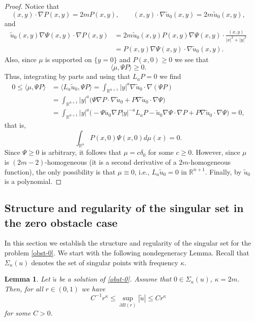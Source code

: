 \documentclass[11pt]{amsart}
\theoremstyle{plain}
\newtheorem{lemma}[thrm]{Lemma}
\numberwithin{equation}{section}
\begin{document}
\begin{proof}
Notice that
\[(x,y)\cdot \nabla P(x,y)=2mP(x,y),\qquad (x,y)\cdot \nabla \tilde u_0(x,y)=2m\tilde u_0(x,y),\]
and
\[\begin{split}
\tilde u_0(x,y)\nabla \Psi(x,y)\cdot \nabla P(x,y) &= 2m\tilde u_0(x,y)P(x,y)\nabla \Psi(x,y)\cdot \frac{(x,y)}{|x|^2+|y|^2}\\
&= P(x,y)\nabla \Psi(x,y)\cdot\nabla \tilde u_0(x,y).
\end{split}\]
Also, since $\mu$ is supported on $\{y=0\}$ and $P(x,0)\geq0$ we see that
\[\langle\mu,\Psi P\rangle \geq0.\]
Thus, integrating by parts and using that $L_aP=0$ we find
\[\begin{split}
0\leq \langle\mu,\Psi P\rangle &= \langle L_a\tilde u_0,\Psi P\rangle=\int_{{\mathbb R}^{n+1}} |y|^a \nabla \tilde u_0\cdot \nabla(\Psi P)\\
&=\int_{{\mathbb R}^{n+1}} |y|^a\bigl(\Psi \nabla P\cdot \nabla \tilde u_0+P\nabla \tilde u_0\cdot\nabla\Psi\bigr) \\
&=\int_{{\mathbb R}^{n+1}} |y|^a\bigl(-\Psi \tilde u_0\nabla P|y|^{-a}L_aP-\tilde u_0\nabla\Psi\cdot\nabla P+P\nabla \tilde u_0\cdot\nabla\Psi\bigr) =0,
\end{split}\]
that is,
\[\int_{{\mathbb R}^n} P(x,0)\Psi(x,0)d\mu(x)=0.\]
Since $\Psi\geq0$ is arbitrary, it follows that $\mu=c\delta_0$ for some $c\geq0$.
However, since $\mu$ is $(2m-2)$-homogeneous (it is a second derivative of a $2m$-homogeneous function), the only possibility is that $\mu\equiv0$, i.e., $L_a\tilde u_0=0$ in ${\mathbb R}^{n+1}$.
Finally, by \cite[Lemma 5.3]{CSS} $\tilde u_0$ is a polynomial.
\end{proof}

\subsection{Structure and regularity of the singular set in the zero obstacle case}

In this section we establish the structure and regularity of the singular set for the problem \eqref{obst-0}.
We start with the following nondegeneracy Lemma.
Recall that $\Sigma_\kappa(u)$ denotes the set of singular points with frequency $\kappa$.

\begin{lemma}\label{nondegeneracy-0}
Let $\tilde u$ be a solution of \eqref{obst-0}.
Assume that $0\in \Sigma_\kappa(u)$, $\kappa=2m$.
Then, for all $r\in(0,1)$ we have
\[C^{-1}r^\kappa\leq \sup_{\partial B(r)}|\tilde u|\leq Cr^\kappa\]
for some $C>0$.
\end{lemma}
\end{document}
